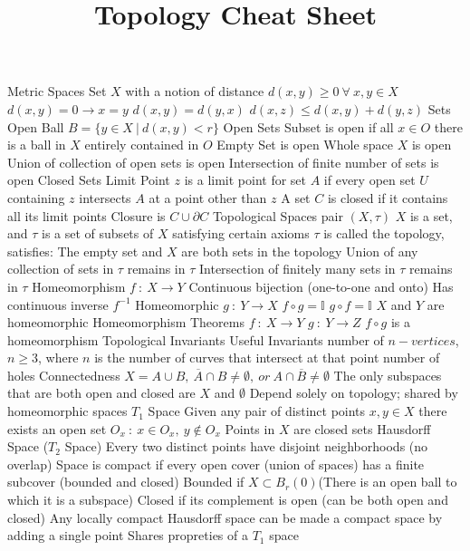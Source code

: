 \documentclass[14pt]{extarticle}
\title{Topology Cheat Sheet}
\begin{document}
	\maketitle

	
	\begin{outline}		
		\1	Metric Spaces
			\2	Set $X$ with a notion of distance
				\3	$d(x,y) \ge 0~\forall~x,y \in X$
				\3	$d(x,y) = 0 \rightarrow x = y$
				\3	$d(x,y) = d(y,x)$
				\3	$d(x,z) \le d(x,y) + d(y,z)$
		\1	Sets
			\2	Open Ball $B = \{y \in X~|~d(x,y) < r\}$
			\2	Open Sets
				\3	Subset is open if all $x \in O$ there is a ball in $X$ entirely contained in $O$
				\3	Empty Set is open
				\3	Whole space $X$ is open
				\3	Union of collection of open sets is open
				\3	Intersection of finite number of sets is open
			\2	Closed Sets
				\3	Limit Point
					\4	$z$ is a limit point for set $A$ if every open set $U$ containing $z$ intersects $A$ at a point other than $z$
				\3	A set $C$ is closed if it contains all its limit points
				\3	Closure is $C \cup \partial C$
		\1	Topological Spaces
			\2	pair $(X,\tau)$
				\3	$X$ is a set, and $\tau$ is a set of subsets of $X$ satisfying certain axioms
				\3	$\tau$ is called the topology, satisfies:
					\4	The empty set and $X$ are both sets in the topology
					\4	Union of any collection of sets in $\tau$ remains in $\tau$
					\4	Intersection of finitely many sets in $\tau$ remains in $\tau$
		\1	Homeomorphism
			\2	$f~:~X \rightarrow Y$ 
				\3	Continuous bijection (one-to-one and onto)
				\3	Has continuous inverse $f^{-1}$
			\2	Homeomorphic
				\3	$g~:~Y \rightarrow X$ 
				\3	$f \circ g = \mathbb{I}$
				\3	$g \circ f = \mathbb{I}$
				\3	$X$ and $Y$ are homeomorphic
			\2	Homeomorphism Theorems
				\3	$f~:~X\rightarrow Y$ $g~:~Y\rightarrow Z$
				\3	$f \circ g$ is a homeomorphism
		\1	Topological Invariants
			\2	Useful Invariants
				\3	number of $n-vertices$, $n \ge 3$, where $n$ is the number of curves that intersect at that point
				\3	number of holes
				\3	Connectedness
					\4	$X = A \cup B,~\overline{A} \cap B \ne \emptyset,~or~A \cap \overline{B} \ne \emptyset$
					\4	The only subspaces that are both open and closed are $X$ and $\emptyset$ 
			\2	Depend solely on topology; shared by homeomorphic spaces
			\2	$T_1$ Space	
				\3	Given any pair of distinct points $x,y \in X$ there exists an open set $O_x~:~x \in O_x,~y \notin O_x$
				\3	Points in $X$ are closed sets
			\2	Hausdorff Space ($T_2$ Space)
				\3	Every two distinct points have disjoint neighborhoods (no overlap)
				\3	Space is compact if every open cover (union of spaces) has a finite subcover (bounded and closed)
					\4	Bounded if $X \subset B_r(0)$(There is an open ball to which it is a subspace)	
					\4	Closed if its complement is open (can be both open and closed)
				\3	Any locally compact Hausdorff space can be made a compact space by adding a single point
				\3	Shares propreties of a $T_1$ space


\end{outline}
\end{document}
